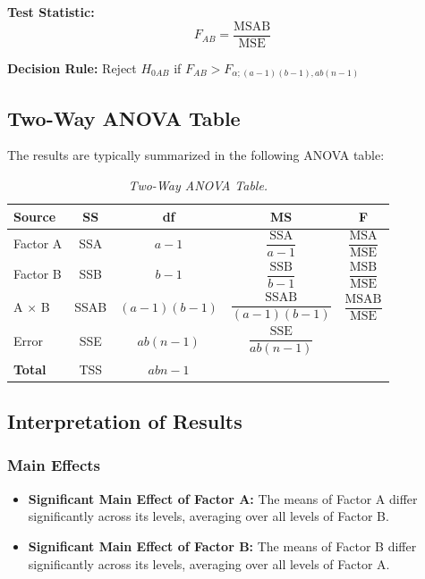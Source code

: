 \documentclass[twoside]{book}
\begin{document}
\textbf{Test Statistic:} $$ F_{AB} = \dfrac{\text{MSAB}}{\text{MSE}} $$

\textbf{Decision Rule:} Reject $H_{0AB}$ if $F_{AB} > F_{\alpha; (a-1)(b-1), ab(n-1)}$

\subsection{Two-Way ANOVA Table}

The results are typically summarized in the following ANOVA table:

\begin{table}[H]
\centering
\begin{tabular}{l|c|c|c|c}
\toprule
\textbf{Source} & \textbf{SS} & \textbf{df} & \textbf{MS} & \textbf{F} \\
\midrule
Factor A & SSA & $a-1$ & $\dfrac{\text{SSA}}{a-1}$ & $\dfrac{\text{MSA}}{\text{MSE}}$ \\
\midrule
Factor B & SSB & $b-1$ & $\dfrac{\text{SSB}}{b-1}$ & $\dfrac{\text{MSB}}{\text{MSE}}$ \\
\midrule
A $\times$ B & SSAB & $(a-1)(b-1)$ & $\dfrac{\text{SSAB}}{(a-1)(b-1)}$ & $\dfrac{\text{MSAB}}{\text{MSE}}$ \\
\midrule
Error & SSE & $ab(n-1)$ & $\dfrac{\text{SSE}}{ab(n-1)}$ & \\
\midrule
\textbf{Total} & TSS & $abn-1$ & & \\
\bottomrule
\end{tabular}
\caption{\textit{Two-Way ANOVA Table.}}
\end{table}

\subsection{Interpretation of Results}

\subsubsection*{Main Effects}

\begin{itemize}
\item \textbf{Significant Main Effect of Factor A:} The means of Factor A differ significantly across its levels, averaging over all levels of Factor B.
\item \textbf{Significant Main Effect of Factor B:} The means of Factor B differ significantly across its levels, averaging over all levels of Factor A.
\end{itemize}
\end{document}
